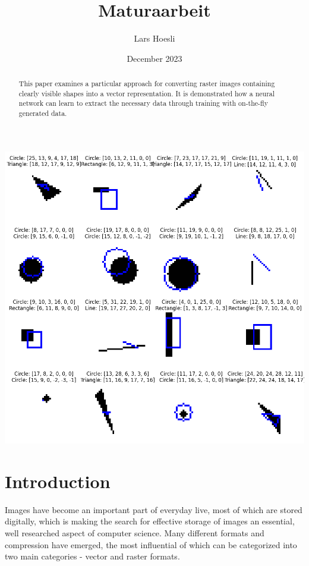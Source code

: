 \documentclass[12pt, a4paper, titlepage]{report}
\title{Maturaarbeit}
\author{Lars Hoesli}
\date{December 2023}
\begin{document}
\begin{titlepage}
    \centering

    \Huge{\textbf{\inserttitle}}
    \par
    \LARGE{\insertauthor}

    \large{\insertdate}
    \vspace{2cm}

    \includegraphics[width=1.0\textwidth]{../rc/images/all_shapes_approx_visual1.png}
    \vfill
    \begin{abstract}
		 This paper examines a particular approach for converting raster images containing clearly visible shapes into a vector representation.
		 It is demonstrated how a neural network can learn to extract the necessary data through training with on-the-fly generated data.
    \end{abstract}
\end{titlepage}


\tableofcontents


\chapter{Introduction}

Images have become an important part of everyday live, most of which are stored digitally, which is making the search for effective storage of images an essential, well researched aspect of computer science.
Many different formats and compression have emerged, the most influential of which can be categorized into two main categories - vector and raster formats.
\end{document}
